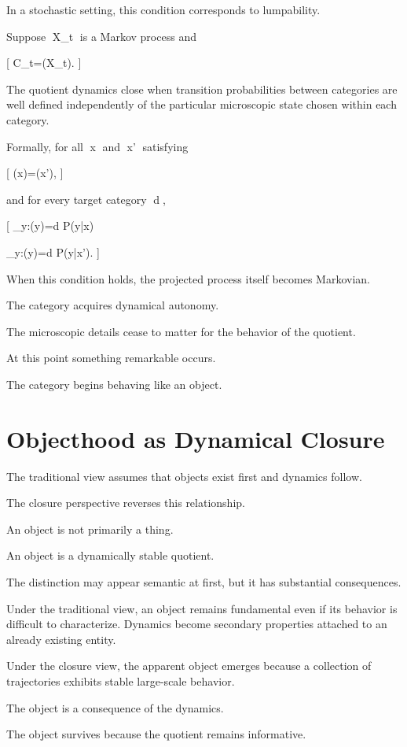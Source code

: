 \documentclass[11pt,oneside,openany]{book}
\begin{document}
In a stochastic setting, this condition corresponds to lumpability.

Suppose X_t is a Markov process and

[
C_t=\pi(X_t).
]

The quotient dynamics close when transition probabilities between categories are well defined independently of the particular microscopic state chosen within each category.

Formally, for all x and x' satisfying

[
\pi(x)=\pi(x'),
]

and for every target category d,

[
\sum_{y:\pi(y)=d} P(y|x)

\sum_{y:\pi(y)=d} P(y|x').
]

When this condition holds, the projected process itself becomes Markovian.

The category acquires dynamical autonomy.

The microscopic details cease to matter for the behavior of the quotient.

At this point something remarkable occurs.

The category begins behaving like an object.

\section{Objecthood as Dynamical Closure}

The traditional view assumes that objects exist first and dynamics follow.

The closure perspective reverses this relationship.

An object is not primarily a thing.

An object is a dynamically stable quotient.

The distinction may appear semantic at first, but it has substantial consequences.

Under the traditional view, an object remains fundamental even if its behavior is difficult to characterize. Dynamics become secondary properties attached to an already existing entity.

Under the closure view, the apparent object emerges because a collection of trajectories exhibits stable large-scale behavior.

The object is a consequence of the dynamics.

The object survives because the quotient remains informative.
\end{document}

